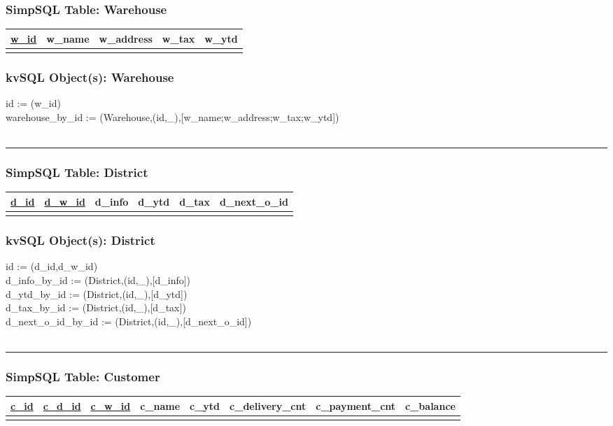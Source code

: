 \subsubsection*{SimpSQL Table: Warehouse}  
\begin{tabular}{ |c|c|c|c|c| }
 \hline
 \underline{w\_id} & w\_name & w\_address & w\_tax & w\_ytd \\
 \hline
 &   &   & & \\
 \hline
\end{tabular}

\subsubsection*{kvSQL Object(s): Warehouse}  
id := (w\_id) \\
warehouse\_by\_id :=
(Warehouse,(id,\_),[w\_name;w\_address;w\_tax;w\_ytd]) 
\\ \\
\hrule

\subsubsection*{SimpSQL Table: District}  
\begin{tabular}{ |c|c|c|c|c|c| }
 \hline
 \underline{d\_id} & \underline{d\_w\_id} & d\_info & d\_ytd & d\_tax & d\_next\_o\_id\\
 \hline
 &   &   & & &\\
 \hline
\end{tabular}

\subsubsection*{kvSQL Object(s): District}  
 id := (d\_id,d\_w\_id) \\
 d\_info\_by\_id := 
(District,(id,\_),[d\_info])  \\
 d\_ytd\_by\_id := 
(District,(id,\_),[d\_ytd])  \\
 d\_tax\_by\_id := 
(District,(id,\_),[d\_tax])  \\
 d\_next\_o\_id\_by\_id := 
(District,(id,\_),[d\_next\_o\_id])  \\
\\ 
\hrule

\subsubsection*{SimpSQL Table: Customer}  
\begin{tabular}{ |c|c|c|c|c|c|c|c| }
 \hline
 \underline{c\_id} & \underline{c\_d\_id} & \underline{c\_w\_id} &
 c\_name & c\_ytd &
 c\_delivery\_cnt & c\_payment\_cnt & c\_balance\\
 \hline
 &   &   & & & & &\\
 \hline
\end{tabular}

